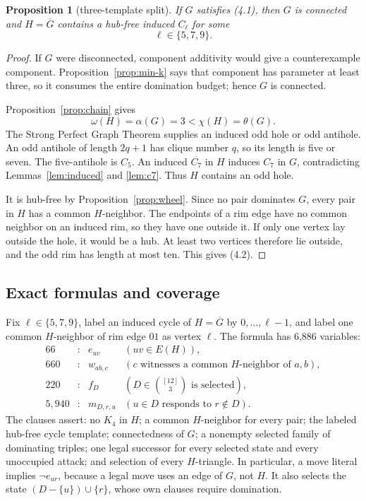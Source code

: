 \documentclass[11pt]{article}
\newtheorem{proposition}[theorem]{Proposition}
\theoremstyle{definition}
\theoremstyle{remark}
\begin{document}
\begin{proposition}[three-template split]\label{prop:k3-split}
If \(G\) satisfies (4.1), then \(G\) is connected and
\(H=\overline G\) contains a hub-free induced \(C_\ell\) for some
\[
  \ell\in\{5,7,9\}.
\tag{4.2}
\]
\end{proposition}

\begin{proof}
If \(G\) were disconnected, component additivity would give a
counterexample component.  Proposition~\ref{prop:min-k} says that component
has parameter at least three, so it consumes the entire domination budget;
hence \(G\) is connected.

Proposition~\ref{prop:chain} gives
\[
  \omega(H)=\alpha(G)=3<\chi(H)=\theta(G).
\tag{4.3}
\]
The Strong Perfect Graph Theorem supplies an induced odd hole or odd
antihole.  An odd antihole of length \(2q+1\) has clique number \(q\), so
its length is five or seven.  The five-antihole is \(C_5\).  An induced
\(\overline{C_7}\) in \(H\) induces \(C_7\) in \(G\), contradicting
Lemmas~\ref{lem:induced} and \ref{lem:c7}.  Thus \(H\) contains an odd hole.

It is hub-free by Proposition~\ref{prop:wheel}.  Since no pair dominates
\(G\), every pair in \(H\) has a common \(H\)-neighbor.  The endpoints of
a rim edge have no common neighbor on an induced rim, so they have one
outside it.  If only one vertex lay outside the hole, it would be a hub.
At least two vertices therefore lie outside, and the odd rim has length at
most ten.  This gives (4.2).
\end{proof}

\subsection{Exact formulas and coverage}

Fix \(\ell\in\{5,7,9\}\), label an induced cycle of
\(H=\overline G\) by \(0,\ldots,\ell-1\), and label one common
\(H\)-neighbor of rim edge \(01\) as vertex \(\ell\).  The formula has
6,886 variables:
\[
\begin{array}{rcll}
66   &:& e_{uv} & (uv\in E(H)),\\
660  &:& w_{ab,c} & (c\text{ witnesses a common }H\text{-neighbor of }a,b),\\
220  &:& f_D & (D\in\binom{[12]}3\text{ is selected}),\\
5,940&:& m_{D,r,u} & (u\in D\text{ responds to }r\notin D).
\end{array}
\tag{4.4}
\]
The clauses assert: no \(K_4\) in \(H\); a common \(H\)-neighbor for every
pair; the labeled hub-free cycle template; connectedness of \(G\); a
nonempty selected family of dominating triples; one legal successor for
every selected state and every unoccupied attack; and selection of every
\(H\)-triangle.  In particular, a move literal implies
\(\neg e_{ur}\), because a legal move uses an edge of \(G\), not \(H\).
It also selects the state \((D-\{u\})\cup\{r\}\), whose own clauses require
domination.
\end{document}
